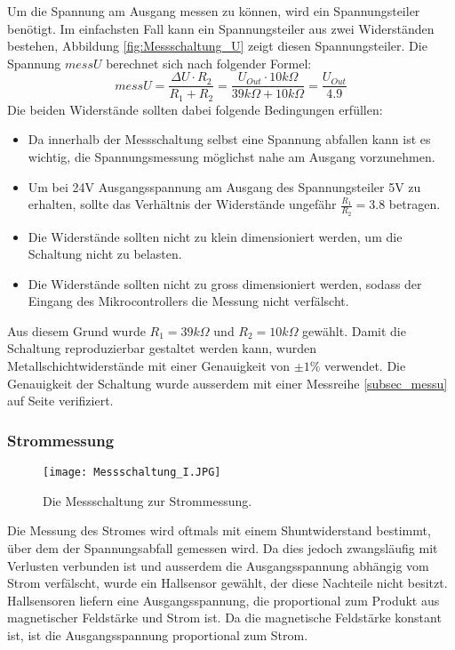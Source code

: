 Um die Spannung am Ausgang messen zu können, wird ein Spannungsteiler benötigt. Im einfachsten Fall kann ein Spannungsteiler aus zwei Widerständen bestehen, Abbildung \ref{fig:Messschaltung_U} zeigt diesen Spannungsteiler. Die Spannung $messU$ berechnet sich nach folgender Formel:
\begin{equation}
	messU=\frac{\Delta U\cdot R_2}{R_1+R_2}=\frac{U_{Out}\cdot10k\Omega}{39k\Omega +10k\Omega}=\frac{U_{Out}}{4.9}
\label{eq:messU}
\end{equation}
 Die beiden Widerstände sollten dabei folgende Bedingungen erfüllen:
\begin{itemize}
	\item Da innerhalb der Messschaltung selbst eine Spannung abfallen kann ist es wichtig, die Spannungsmessung möglichst nahe am Ausgang vorzunehmen.
	\item Um bei 24V Ausgangsspannung am Ausgang des Spannungsteiler 5V zu erhalten, sollte das Ver\-hält\-nis der Widerstände ungefähr $\frac{R_1}{R_2}=3.8$ betragen.
	\item Die Widerstände sollten nicht zu klein dimensioniert werden, um die Schaltung nicht zu belasten.
	\item Die Widerstände sollten nicht zu gross dimensioniert werden, sodass der Eingang des Mikrocontrollers die Messung nicht verfälscht.
\end{itemize}
Aus diesem Grund wurde $R_1=39k\Omega$ und $R_2=10k\Omega$ gewählt. Damit die Schaltung reproduzierbar gestaltet werden kann, wurden Metallschichtwiderstände mit einer Genauigkeit von $\pm 1\%$ verwendet. Die Genauigkeit der Schaltung wurde ausserdem mit einer Messreihe \ref{subsec_messu} auf Seite \pageref{subsec_messu} verifiziert.

\subsubsection{Strommessung}
\begin{figure}[h]
	\centering
		\texttt{[image: Messschaltung\_I.JPG]}
	\caption{Die Messschaltung zur Strommessung.}
	\label{fig:Messschaltung_I}
\end{figure}
Die Messung des Stromes wird oftmals mit einem Shuntwiderstand bestimmt, über dem der Spannungsabfall gemessen wird. Da dies jedoch zwangsläufig mit Verlusten verbunden ist und ausserdem die Ausgangsspannung abhängig vom Strom verfälscht, wurde ein Hallsensor gewählt, der diese Nachteile nicht besitzt. Hallsensoren liefern eine Ausgangsspannung, die proportional zum Produkt aus magnetischer Feldstärke und Strom ist. Da die magnetische Feldstärke konstant ist, ist die Ausgangsspannung proportional zum Strom.

